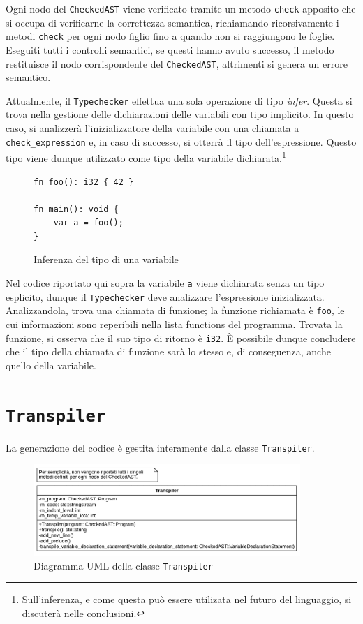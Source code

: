 Ogni nodo del \texttt{CheckedAST} viene verificato tramite un metodo \texttt{check} apposito che si occupa di verificarne la correttezza semantica, richiamando ricorsivamente i metodi \texttt{check} per ogni nodo figlio fino a quando non si raggiungono le foglie. Eseguiti tutti i controlli semantici, se questi hanno avuto successo, il metodo restituisce il nodo corrispondente del \texttt{CheckedAST}, altrimenti si genera un errore semantico.

Attualmente, il \texttt{Typechecker} effettua una sola operazione di tipo \textit{infer}. Questa si trova nella gestione delle dichiarazioni delle variabili con tipo implicito. In questo caso, si analizzer\`a l'inizializzatore della variabile con una chiamata a \texttt{check\_expression} e, in caso di successo, si otterr\`a il tipo dell'espressione. Questo tipo viene dunque utilizzato come tipo della variabile dichiarata.\footnote{Sull'inferenza, e come questa pu\`o essere utilizata nel futuro del linguaggio, si discuter\`a nelle conclusioni.}

\begin{figure}[H]
	\centering
	\begin{verbatim}
fn foo(): i32 { 42 }

fn main(): void {
    var a = foo();
}
  \end{verbatim}
	\caption{Inferenza del tipo di una variabile}
	\label{fig:typechecker-var-decl-infer}
\end{figure}

Nel codice riportato qui sopra la variabile \texttt{a} viene dichiarata senza un tipo esplicito, dunque il \texttt{Typechecker} deve analizzare l'espressione inizializzata. Analizzandola, trova una chiamata di funzione; la funzione richiamata è \texttt{foo}, le cui informazioni sono reperibili nella lista functions del programma. Trovata la funzione, si osserva che il suo tipo di ritorno è \texttt{i32}. È possibile dunque concludere che il tipo della chiamata di funzione sarà lo stesso e, di conseguenza, anche quello della variabile.

\section{\texttt{Transpiler}}
\label{sec:transpiler}

La generazione del codice \`e gestita interamente dalla classe \texttt{Transpiler}.

\begin{figure}[H]
	\centering
	\includegraphics[width=0.9\textwidth]{figures/transpiler.png}
	\caption{Diagramma UML della classe \texttt{Transpiler}}
	\label{fig:transpiler-uml}
\end{figure}

